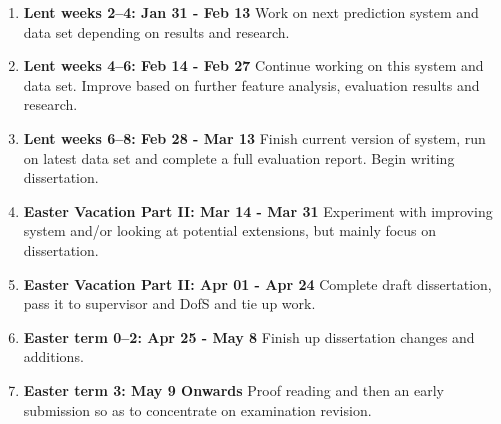 \documentclass[12pt,a4paper,twoside]{article}
\begin{document}
\begin{enumerate}
\item \textbf{Lent weeks 2--4: Jan 31 - Feb 13} Work on next prediction system and data set depending on results and research.

\item \textbf{Lent weeks 4--6: Feb 14 - Feb 27} Continue working on this system and data set. Improve based on further feature analysis, evaluation results and research.

\item \textbf{Lent weeks 6--8: Feb 28 - Mar 13} Finish current version of system, run on latest data set and complete a full evaluation report. Begin writing dissertation.

\item \textbf{Easter Vacation Part II: Mar 14 - Mar 31} Experiment with improving system and/or looking at potential extensions, but mainly focus on dissertation. 

\item \textbf{Easter Vacation Part II: Apr 01 - Apr 24} Complete draft dissertation, pass it to supervisor and DofS and tie up work.

\item \textbf{Easter term 0--2: Apr 25 - May 8} Finish up dissertation changes and additions.

\item \textbf{Easter term 3: May 9 Onwards} Proof reading and then an early submission so as to concentrate on examination revision.

\end{enumerate}
\end{document}
